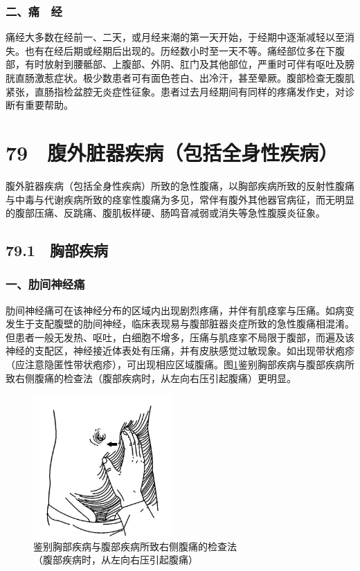 \subsubsection{二、痛　经}

痛经大多数在经前一、二天，或月经来潮的第一天开始，于经期中逐渐减轻以至消失。也有在经后期或经期后出现的。历经数小时至一天不等。痛经部位多在下腹部，有时放射到腰骶部、上腹部、外阴、肛门及其他部位，严重时可伴有呕吐及膀胱直肠激惹症状。极少数患者可有面色苍白、出冷汗，甚至晕厥。腹部检查无腹肌紧张，直肠指检盆腔无炎症性征象。患者过去月经期间有同样的疼痛发作史，对诊断有重要帮助。

\protect\hypertarget{text00200.html}{}{}

\section{79　腹外脏器疾病（包括全身性疾病）}

腹外脏器疾病（包括全身性疾病）所致的急性腹痛，以胸部疾病所致的反射性腹痛与中毒与代谢疾病所致的痉挛性腹痛为多见，常伴有腹外其他器官病征，而无明显的腹部压痛、反跳痛、腹肌板样硬、肠鸣音减弱或消失等急性腹膜炎征象。

\subsection{79.1　胸部疾病}

\subsubsection{一、肋间神经痛}

肋间神经痛可在该神经分布的区域内出现剧烈疼痛，并伴有肌痉挛与压痛。如病变发生于支配腹壁的肋间神经，临床表现易与腹部脏器炎症所致的急性腹痛相混淆。但患者一般无发热、呕吐，白细胞不增多，压痛与肌痉挛不局限于腹部，而遍及该神经的支配区，神经接近体表处有压痛，并有皮肤感觉过敏现象。如出现带状疱疹（应注意隐匿性带状疱疹），可出现相应区域腹痛。图\ref{fig25-5}鉴别胸部疾病与腹部疾病所致右侧腹痛的检查法（腹部疾病时，从左向右压引起腹痛）更明显。

\begin{figure}[!htbp]
 \centering
 \includegraphics[width=2.08333in,height=2.13542in]{./images/Image00146.jpg}
 \captionsetup{justification=centering}
 \caption{鉴别胸部疾病与腹部疾病所致右侧腹痛的检查法\\{\small （腹部疾病时，从左向右压引起腹痛）}}
 \label{fig25-5}
  \end{figure} 



